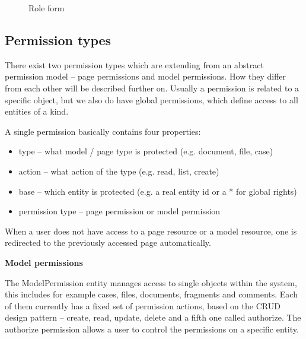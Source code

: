 \begin{figure}[!h]
  \centering
  \caption{Role form}
  \label{fig:roles-form}
\end{figure}

\subsection{Permission types}

There exist two permission types which are extending from an abstract permission model – page permissions and model permissions. How they differ from each other will be described further on. Usually a permission is related to a specific object, but we also do have global permissions, which define access to all entities of a kind. 

A single permission basically contains four properties:

\begin{itemize}
\item      type – what model / page type is protected (e.g. document, file, case) 
\item      action – what action of the type (e.g. read, list, create)
\item      base – which entity is protected (e.g. a real entity id or a * for global rights)
\item      permission type – page permission or model permission
\end{itemize}

When a user does not have access to a page resource or a model resource, one is redirected to the previously accessed page automatically.

\textbf{Model permissions}

The ModelPermission entity manages access to single objects within the system, this includes for example cases, files, documents, fragments and comments. Each of them currently has a fixed set of permission actions, based on the CRUD design pattern – create, read, update, delete and a fifth one called authorize. The authorize permission allows a user to control the permissions on a specific entity.

